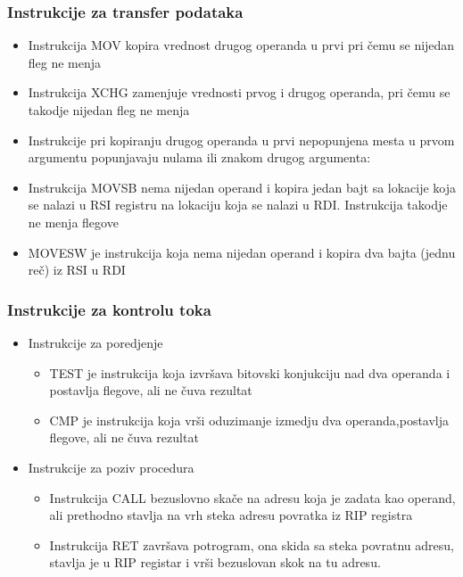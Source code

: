 \documentclass[hyperref={pdfpagelabels=false}]{beamer}
\begin{document}
	\begin{frame}
		\frametitle{Instrukcije za transfer podataka} 
		\begin{itemize}
			\item \pause Instrukcija MOV kopira vrednost drugog operanda u prvi pri \v cemu se nijedan fleg ne menja \pause
			\item Instrukcija XCHG zamenjuje vrednosti prvog i drugog operanda, pri \v cemu se takodje nijedan fleg ne menja\pause
			\item Instrukcije pri kopiranju drugog operanda u prvi nepopunjena mesta u prvom argumentu popunjavaju nulama ili znakom drugog argumenta:\pause
			\item Instrukcija MOVSB nema nijedan operand i kopira jedan bajt sa lokacije koja se nalazi u RSI registru na lokaciju koja se nalazi u RDI.
			Instrukcija takodje ne menja flegove
			\item MOVESW je instrukcija koja nema nijedan operand i kopira dva bajta (jednu re\v c) iz RSI u RDI
		\end{itemize}
	\end{frame}

	
	\begin{frame}
		\frametitle{Instrukcije za kontrolu toka}
		\begin{itemize}	
			\item \pause Instrukcije za poredjenje \pause
				\begin{itemize}
					\item TEST je instrukcija koja izvr\v sava bitovski konjukciju nad dva operanda i postavlja flegove, ali ne \v cuva rezultat \pause
					\item CMP je instrukcija koja vr\v si oduzimanje izmedju dva operanda,postavlja flegove, ali ne \v cuva rezultat \pause
				\end{itemize}
			
			\item Instrukcije za poziv procedura\pause
				\begin{itemize}
					\item Instrukcija CALL bezuslovno ska\v ce na adresu koja je zadata kao operand, ali prethodno stavlja na vrh steka adresu povratka iz RIP
					registra \pause
					\item Instrukcija RET zavr\v sava potrogram, ona skida sa steka povratnu adresu, stavlja je u RIP registar i vr\v si bezuslovan skok na tu adresu.
				\end{itemize}
		\end{itemize}
	\end{frame}
			
\end{document}
